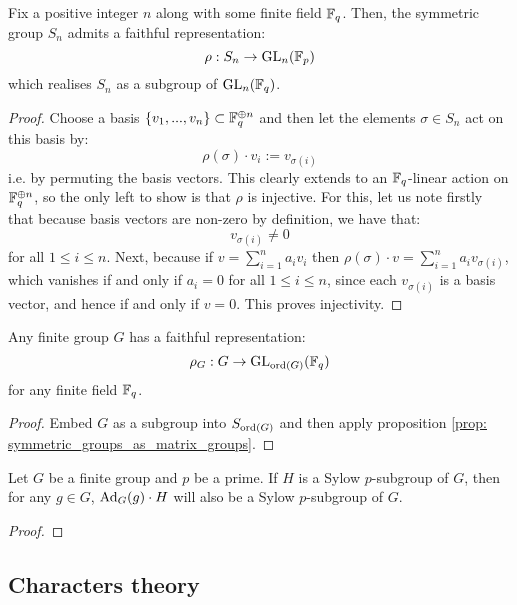         \begin{proposition} \label{prop: symmetric_groups_as_matrix_groups}
            Fix a positive integer $n$ along with some finite field $\mathbb{F}_q$. Then, the symmetric group $S_n$ admits a faithful representation:
                $$\rho: S_n \to \mathrm{GL}_n(\mathbb{F}_p)$$
            which realises $S_n$ as a subgroup of $\mathrm{GL}_n(\mathbb{F}_q)$.
        \end{proposition}
            \begin{proof}
                Choose a basis $\{v_1, ..., v_n\} \subset \mathbb{F}_q^{\oplus n}$ and then let the elements $\sigma \in S_n$ act on this basis by:
                    $$\rho(\sigma) \cdot v_i := v_{\sigma(i)}$$
                i.e. by permuting the basis vectors. This clearly extends to an $\mathbb{F}_q$-linear action on $\mathbb{F}_q^{\oplus n}$, so the only left to show is that $\rho$ is injective. For this, let us note firstly that because basis vectors are non-zero by definition, we have that:
                    $$v_{\sigma(i)} \not = 0$$
                for all $1 \leq i \leq n$. Next, because if $v = \sum_{i = 1}^n a_i v_i$ then $\rho(\sigma) \cdot v = \sum_{i = 1}^n a_i v_{\sigma(i)}$, which vanishes if and only if $a_i = 0$ for all $1 \leq i \leq n$, since each $v_{\sigma(i)}$ is a basis vector, and hence if and only if $v = 0$. This proves injectivity.
            \end{proof}
        \begin{corollary} \label{coro: finite_groups_as_matrix_groups}
            Any finite group $G$ has a faithful representation:
                $$\rho_G: G \to \mathrm{GL}_{\operatorname{ord}(G)}(\mathbb{F}_q)$$
            for any finite field $\mathbb{F}_q$.
        \end{corollary}
            \begin{proof}
                Embed $G$ as a subgroup into $S_{\operatorname{ord}(G)}$ and then apply proposition \ref{prop: symmetric_groups_as_matrix_groups}.
            \end{proof}
        
        \begin{lemma} \label{lemma: conjugacies_of_sylow_subgroups}
            Let $G$ be a finite group and $p$ be a prime. If $H$ is a Sylow $p$-subgroup of $G$, then for any $g \in G$, $\mathrm{Ad}_G(g) \cdot H$ will also be a Sylow $p$-subgroup of $G$.
        \end{lemma}
            \begin{proof}
                
            \end{proof}

    \subsection{Characters theory}